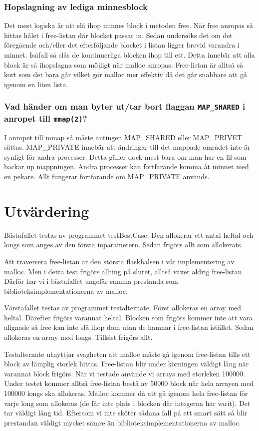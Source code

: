 \documentclass[a4paper]{article}
\begin{document}

\subsubsection*{Hopslagning av lediga minnesblock }
Det mest logiska är att slå ihop minnes block i metoden free. När free anropas så hittas hålet i free-listan där blocket passar in. Sedan undersöks det om det föregående och/eller det efterföljande blocket i listan ligger brevid varandra i minnet. Isåfall så slås de kontinuerliga blocken ihop till ett. Detta innebär att alla block är så ihopslagna som möjligt när malloc anropas. Free-listan är alltså så kort som det bara går vilket gör malloc mer effektiv då det går snabbare att gå igenom en liten lista.

\subsubsection*{Vad händer om man byter ut/tar bort flaggan \texttt{MAP\_SHARED} i anropet till \texttt{mmap(2)}?} %
I anropet till mmap så måste antingen MAP\_SHARED eller MAP\_PRIVET sättas. MAP\_PRIVATE innebär att ändringar till det mappade området inte är synligt för andra processer. Detta gäller dock mest bara om man har en fil som backar up mappningen. Andra processer kan fortfarande komma åt minnet med en pekare. Allt fungerar fortfarande om MAP\_PRIVATE används.

\section*{Utvärdering}
Bästafallet testas av programmet testBestCase. Den allokerar ett antal heltal och longs som anges av den första inparametern. Sedan frigörs allt som allokerats. 

Att traversera free-listan är den största flaskhalsen i vår implementering av malloc. Men i detta test frigörs allting på slutet, alltså växer aldrig free-listan. Därför har vi i bästafallet ungefär samma prestanda som biblioteksimplementationerna av malloc.

Värstafallet testas av programmet testalternate. Först allokeras en array med heltal. Därefter frigörs varannat heltal. Blocken som frigörs kommer inte att vara alignade så free kan inte slå ihop dom utan de hamnar i free-listan istället. Sedan allokeras en array med longs. Tillsist frigörs allt.

Testalternate utnyttjar svagheten att malloc måste gå igenom free-listan tills ett block av lämplig storlek hittas. Free-listan blir under körningen väldigt lång när varannat block frigörs. När vi testade använde vi arrays med storleken 100000. Under testet kommer alltså free-listan bestå av 50000 block när hela arrayen med 100000 longs ska allokeras. Malloc kommer då att gå igenom hela free-listan för varje long som allokeras (de får inte plats i blocken där integerna har varit). Det tar väldigt lång tid. Eftersom vi inte sköter sådana fall på ett smart sätt så blir prestandan väldigt mycket sämre än biblioteksimplementationerna av malloc. 
\end{document}
